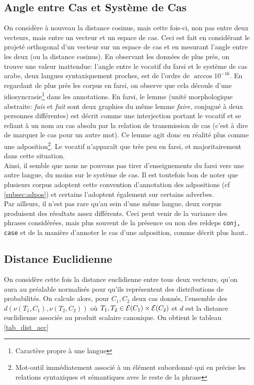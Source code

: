 \documentclass{cours}
\begin{document}
\subsection{Angle entre Cas et Système de Cas}\label{subsec:projection}
On considère à nouveau la distance cosinus, mais cette fois-ci, non pas entre deux vecteurs, mais entre un vecteur et un espace de cas.
Ceci est fait en considérant le projeté orthogonal d'un vecteur sur un espace de cas et en mesurant l'angle entre les deux (ou la distance cosinus).
En observant les données de plus près, on trouve une valeur inattendue: l'angle entre le vocatif du farsi et le système de cas arabe, deux langues syntaxiquement proches, est de l'ordre de $\arccos{10^{-16}}$.
En regardant de plus près les corpus en farsi, on observe que cela découle d'une idiosyncrasie\footnote{Caractère propre à une langue} dans les annotations.
En farsi, le lemme (unité morphologique abstraite: \textsl{fais} et \textsl{fait} sont deux graphies du même lemme \textsl{faire}, conjugué à deux personnes différentes)\label{farsi}
est décrit comme une interjection portant le vocatif et se reliant à un nom au cas absolu par la relation de transmission de cas (c'est à dire de marquer le cas pour un autre mot).
Ce lemme agit donc en réalité plus comme une adposition\footnote{Mot-outil immédiatement associé à un élément subordonné qui en précise les relations syntaxiques et sémantiques avec le reste de la phrase}.
Le vocatif n'apparaît que très peu en farsi, et majoritairement dans cette situation.\\
Ainsi, il semble que nous ne pouvons pas tirer d'enseignements du farsi vers une autre langue, du moins sur le système de cas.
Il est toutefois bon de noter que plusieurs corpus adoptent cette convention d'annotation des adpositions (cf \ref{subsec:adpos}) et certains l'adoptent également sur certains adverbes.\\
Par ailleurs, il n'est pas rare qu'au sein d'une même langue, deux corpus produisent des résultats assez différents. Ceci peut venir de la variance des phrases considérées, mais plus souvent de la présence ou non des reldeps \texttt{conj, case} et de la manière d'annoter le cas d'une adposition, comme décrit plus haut..

\subsection{Distance Euclidienne}\label{subsec:l2}
On considère cette fois la distance euclidienne entre tous deux vecteurs, qu'on aura au préalable normalisés pour qu'ils représentent des distributions de probabilités.
On calcule alors, pour $C_{1}, C_{2}$ deux cas donnés, l'ensemble des $d\left(\nu\left(T_{1}, C_{1}\right), \nu\left(T_{2}, C_{2}\right)\right)$ où $T_{1}, T_{2} \in \mathcal{E}(C_{1})\times \mathcal{E}(C_{2})$ et $d$ est la distance euclidienne associée au produit scalaire canonique.
On obtient le tableau \ref{tab_dist_acc}
\end{document}
